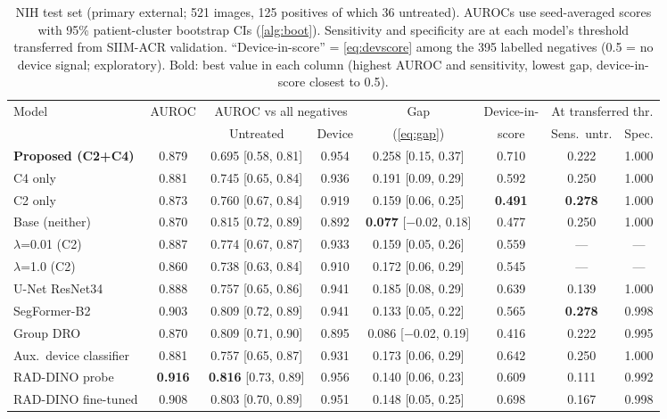 \documentclass[final,3p]{elsarticle}
\newcommand{\ci}[2]{\scriptsize[#1, #2]}
\begin{document}
\begin{table}[!tbp]
\centering\small
\setlength{\tabcolsep}{3.5pt}
\caption{NIH test set (primary external; 521 images, 125 positives of which 36 untreated). AUROCs use seed-averaged scores with 95\% patient-cluster bootstrap CIs (\cref{alg:boot}). Sensitivity and specificity are at each model's threshold transferred from SIIM-ACR validation. ``Device-in-score'' = \cref{eq:devscore} among the 395 labelled negatives (0.5 = no device signal; exploratory). Bold: best value in each column (highest AUROC and sensitivity, lowest gap, device-in-score closest to 0.5).}
\label{tab:nih}
\begin{tabular}{@{}l c c c c c c c@{}}
\toprule
Model & AUROC & \multicolumn{2}{c}{AUROC vs all negatives} & Gap & Device-in- & \multicolumn{2}{c}{At transferred thr.} \\
\cmidrule(lr){3-4}\cmidrule(l){7-8}
 & & Untreated & Device & (\cref{eq:gap}) & score & Sens.\ untr. & Spec. \\
\midrule
\rowcolor{band}\textbf{Proposed (C2+C4)} & 0.879 & 0.695 \ci{0.58}{0.81} & 0.954 & 0.258 \ci{0.15}{0.37} & 0.710 & 0.222 & 1.000 \\
C4 only & 0.881 & 0.745 \ci{0.65}{0.84} & 0.936 & 0.191 \ci{0.09}{0.29} & 0.592 & 0.250 & 1.000 \\
C2 only & 0.873 & 0.760 \ci{0.67}{0.84} & 0.919 & 0.159 \ci{0.06}{0.25} & \textbf{0.491} & \textbf{0.278} & 1.000 \\
Base (neither) & 0.870 & 0.815 \ci{0.72}{0.89} & 0.892 & \textbf{0.077} \ci{$-$0.02}{0.18} & 0.477 & 0.250 & 1.000 \\
$\lambda$=0.01 (C2) & 0.887 & 0.774 \ci{0.67}{0.87} & 0.933 & 0.159 \ci{0.05}{0.26} & 0.559 & --- & --- \\
$\lambda$=1.0 (C2) & 0.860 & 0.738 \ci{0.63}{0.84} & 0.910 & 0.172 \ci{0.06}{0.29} & 0.545 & --- & --- \\
\midrule
U-Net ResNet34 & 0.888 & 0.757 \ci{0.65}{0.86} & 0.941 & 0.185 \ci{0.08}{0.29} & 0.639 & 0.139 & 1.000 \\
SegFormer-B2 & 0.903 & 0.809 \ci{0.72}{0.89} & 0.941 & 0.133 \ci{0.05}{0.22} & 0.565 & \textbf{0.278} & 0.998 \\
Group DRO & 0.870 & 0.809 \ci{0.71}{0.90} & 0.895 & 0.086 \ci{$-$0.02}{0.19} & 0.416 & 0.222 & 0.995 \\
Aux.\ device classifier & 0.881 & 0.757 \ci{0.65}{0.87} & 0.931 & 0.173 \ci{0.06}{0.29} & 0.642 & 0.250 & 1.000 \\
RAD-DINO probe & \textbf{0.916} & \textbf{0.816} \ci{0.73}{0.89} & 0.956 & 0.140 \ci{0.06}{0.23} & 0.609 & 0.111 & 0.992 \\
RAD-DINO fine-tuned & 0.908 & 0.803 \ci{0.70}{0.89} & 0.951 & 0.148 \ci{0.05}{0.25} & 0.698 & 0.167 & 0.998 \\
\bottomrule
\end{tabular}
\end{table}
\end{document}
